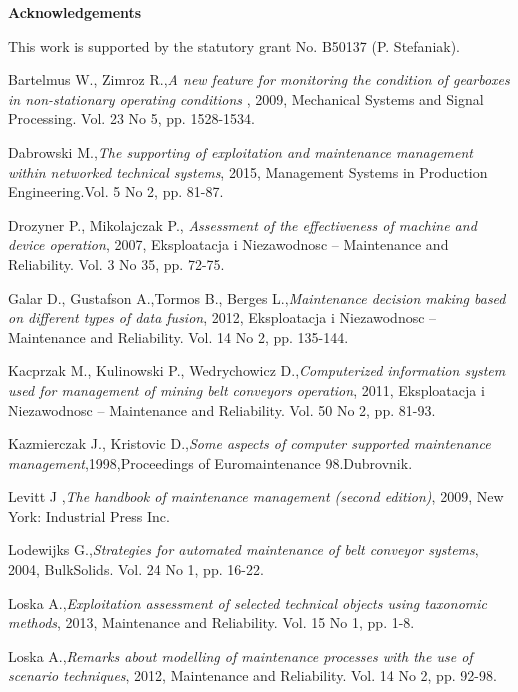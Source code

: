 \textbf{Acknowledgements}\par
This work is supported by the statutory grant No. B50137 (P. Stefaniak).

\begin{thebibliography}{}

 Bartelmus W., Zimroz R.,\emph{A new feature for monitoring the condition of gearboxes in non-stationary operating conditions }, 2009, Mechanical Systems and Signal Processing. Vol. 23 No 5, pp. 1528-1534.

 Dabrowski M.,\emph{The supporting of exploitation and maintenance management within networked technical systems}, 2015, Management Systems in Production Engineering.Vol. 5 No 2, pp. 81-87.

 Drozyner P., Mikolajczak P., \emph{Assessment of the effectiveness of machine and device operation}, 2007, Eksploatacja i Niezawodnosc – Maintenance and Reliability. Vol. 3 No 35, pp. 72-75.

Galar D., Gustafson A.,Tormos B., Berges L.,\emph{Maintenance decision making based on different types of data fusion}, 2012, Eksploatacja i Niezawodnosc – Maintenance and Reliability. Vol. 14 No 2, pp. 135-144.

 Kacprzak M., Kulinowski P., Wedrychowicz D.,\emph{Computerized information system used for management of mining belt conveyors operation}, 2011, Eksploatacja i Niezawodnosc – Maintenance and Reliability. Vol. 50 No 2, pp. 81-93.

 Kazmierczak J., Kristovic D.,\emph{Some aspects of computer supported maintenance management},1998,Proceedings of Euromaintenance 98.Dubrovnik.

 Levitt J ,\emph{The handbook of maintenance management (second edition)}, 2009, New York: Industrial Press Inc.

 Lodewijks G.,\emph{Strategies for automated maintenance of belt conveyor systems}, 2004, BulkSolids. Vol. 24 No 1, pp. 16-22.

 Loska A.,\emph{Exploitation assessment of selected technical objects using taxonomic methods}, 2013, Maintenance and Reliability. Vol. 15 No 1, pp. 1-8.

 Loska A.,\emph{Remarks about modelling of maintenance processes with the use of scenario techniques}, 2012, Maintenance and Reliability. Vol. 14 No 2, pp. 92-98.


\end{thebibliography}
